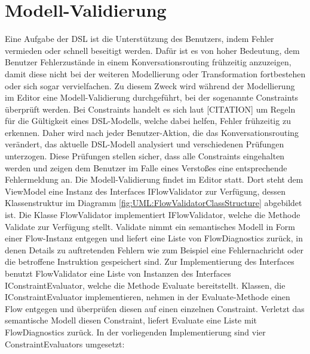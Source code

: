 \section{Modell-Validierung} 
Eine Aufgabe der DSL ist die Unterstützung des Benutzers, indem Fehler vermieden oder schnell beseitigt werden. Dafür ist es von hoher Bedeutung, dem Benutzer Fehlerzustände in einem Konversationsrouting frühzeitig anzuzeigen, damit diese nicht bei der weiteren Modellierung oder Transformation fortbestehen oder sich sogar vervielfachen. Zu diesem Zweck wird während der Modellierung im Editor eine Modell-Validierung durchgeführt, bei der sogenannte Constraints überprüft werden. Bei Constraints handelt es sich laut [CITATION] um Regeln für die Gültigkeit eines DSL-Modells, welche dabei helfen, Fehler frühzeitig zu erkennen. Daher wird nach jeder Benutzer-Aktion, die das Konversationsrouting verändert, das aktuelle DSL-Modell analysiert und verschiedenen Prüfungen unterzogen. Diese Prüfungen stellen sicher, dass alle Constraints eingehalten werden und zeigen dem Benutzer im Falle eines Verstoßes eine entsprechende Fehlermeldung an.
\newline
Die Modell-Validierung findet im Editor statt. Dort steht dem ViewModel eine Instanz des Interfaces IFlowValidator zur Verfügung, dessen Klassenstruktur im Diagramm \ref{fig:UML:FlowValidatorClassStructure} abgebildet ist. Die Klasse FlowValidator implementiert IFlowValidator, welche die Methode Validate zur Verfügung stellt. Validate nimmt ein semantisches Modell in Form einer Flow-Instanz entgegen und liefert eine Liste von FlowDiagnostics zurück, in denen Details zu auftretenden Fehlern wie zum Beispiel eine Fehlernachricht oder die betroffene Instruktion gespeichert sind. Zur Implementierung des Interfaces benutzt FlowValidator eine Liste von Instanzen des Interfaces IConstraintEvaluator, welche die Methode Evaluate bereitstellt. Klassen, die IConstraintEvaluator implementieren, nehmen in der Evaluate-Methode einen Flow entgegen und überprüfen diesen auf einen einzelnen Constraint. Verletzt das semantische Modell diesen Constraint, liefert Evaluate eine Liste mit FlowDiagnostics zurück. In der vorliegenden Implementierung sind vier ConstraintEvaluators umgesetzt: 
